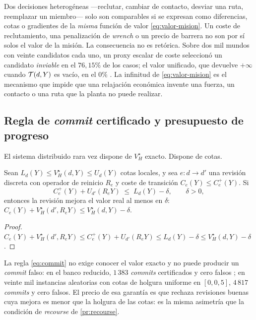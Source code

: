 \begin{observacion}
\label{obs:coherencia-valor}
Dos decisiones heterogéneas —reclutar, cambiar de contacto, desviar una ruta,
reemplazar un miembro— solo son comparables si se expresan como diferencias,
cotas o gradientes de la \emph{misma} función de valor
\eqref{eq:valor-mision}. Un coste de reclutamiento, una penalización de
\emph{wrench} o un precio de barrera no son por sí solos el valor de la misión.
La consecuencia no es retórica. Sobre dos mil mundos con veinte candidatos cada
uno, un proxy escalar de coste seleccionó un candidato \emph{inviable} en el
$76{,}15\%$ de los casos; el valor unificado, que devuelve $+\infty$ cuando
$\mathcal{T}(d,Y)$ es vacío, en el $0\%$ \cite{mayorga2026compendio}. La infinitud de
\eqref{eq:valor-mision} es el mecanismo que impide que una relajación económica
invente una fuerza, un contacto o una ruta que la planta no puede realizar.
\end{observacion}

\subsection{Regla de \emph{commit} certificado y presupuesto de progreso}

El sistema distribuido rara vez dispone de $V_H^\star$ exacto. Dispone de
cotas.

\begin{proposicion}
\label{pr:commit}
Sean $L_d(Y)\le V_H^\star(d,Y)\le U_d(Y)$ cotas locales, y sea $e:d\to d'$ una
revisión discreta con operador de reinicio $R_e$ y coste de transición
$C_e(Y)\le C_e^{+}(Y)$. Si
\begin{equation}
  \label{eq:commit}
  C_e^{+}(Y)+U_{d'}(R_eY)\;\le\;L_d(Y)-\delta,\qquad \delta>0,
\end{equation}
entonces la revisión mejora el valor real al menos en $\delta$:
$C_e(Y)+V_H^\star(d',R_eY)\le V_H^\star(d,Y)-\delta$.
\end{proposicion}

\begin{proof}
$C_e(Y)+V_H^\star(d',R_eY)\le C_e^{+}(Y)+U_{d'}(R_eY)\le L_d(Y)-\delta\le
V_H^\star(d,Y)-\delta$.
\end{proof}

\begin{observacion}
\label{obs:commit-num}
La regla \eqref{eq:commit} no exige conocer el valor exacto y no puede producir
un \emph{commit} falso: en el banco reducido, $1\,383$ \emph{commits}
certificados y cero falsos \cite{mayorga2026compendio}; en veinte mil
instancias aleatorias con cotas de holgura uniforme en $[0,0{,}5]$, $4\,817$
\emph{commits} y cero falsos. El precio de esa garantía es que rechaza
revisiones buenas cuya mejora es menor que la holgura de las cotas: es la
misma asimetría que la condición de \emph{recourse} de \cref{pr:recourse}.
\end{observacion}

